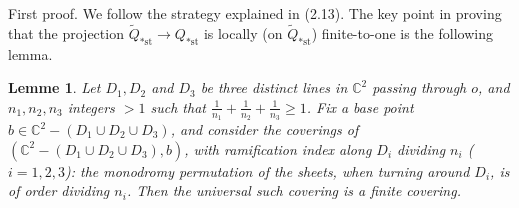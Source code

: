 \documentclass[12pt,a4paper]{article}
\theoremstyle{plain}
\newtheorem{lemma}[theorem]{Lemme}
\theoremstyle{definition}
\theoremstyle{remark}
\begin{document}
First proof. We follow the strategy explained in (2.13). The key point in proving that the projection $\widetilde{Q}_{*\text{st}} \to Q_{*\text{st}}$ is locally (on $\widetilde{Q}_{*\text{st}}$) finite-to-one is the following lemma.

\begin{lemma}
\label{10.3}
Let $D_1, D_2$ and $D_3$ be three distinct lines in $\mathbb{C}^2$ passing through $o$, and $n_1, n_2, n_3$ integers $> 1$ such that $\frac{1}{n_1} + \frac{1}{n_2} + \frac{1}{n_3} \geqslant 1$. Fix a base point $b \in \mathbb{C}^2 - (D_1 \cup D_2 \cup D_3)$, and consider the coverings of $(\mathbb{C}^2 - (D_1 \cup D_2 \cup D_3), b)$, with ramification index along $D_i$ dividing $n_i$ ($i = 1, 2, 3$): the monodromy permutation of the sheets, when turning around $D_i$, is of order dividing $n_i$. Then the universal such covering is a finite covering.
\end{lemma}
\end{document}
